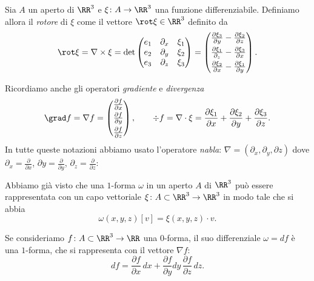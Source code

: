 \begin{definition}[rotore]
Sia $A$ un aperto di $\RR^3$ e $\xi \colon A \to \RR^3$ una funzione differenziabile.
Definiamo allora il \emph{rotore} di $\xi$ come il vettore $\rot \xi \in \RR^3$ 
definito da 
\[
   \rot \xi = \nabla \times \xi
    = \det \begin{pmatrix}
    e_1 & \partial_x & \xi_1 \\
    e_2 & \partial_y & \xi_2 \\
    e_3 & \partial_z & \xi_3 
    \end{pmatrix}
    = \begin{pmatrix}
    \frac{\partial \xi_3}{\partial y} - \frac{\partial \xi_2}{\partial z} \smallskip \\
    \frac{\partial \xi_1}{\partial_z} - \frac{\partial \xi_3}{\partial x} \smallskip \\
    \frac{\partial \xi_2}{\partial x} - \frac{\partial \xi_1}{\partial y}
    \end{pmatrix}.
\]

Ricordiamo anche gli operatori \emph{gradiente} e \emph{divergenza}
\[
  \grad f = \nabla f = \begin{pmatrix}
     \frac{\partial f}{\partial x} \smallskip \\
     \frac{\partial f}{\partial y} \smallskip \\
     \frac{\partial f}{\partial z}
  \end{pmatrix}, \qquad 
  \div f = \nabla \cdot \xi = \frac{\partial \xi_1}{\partial x} + \frac{\partial \xi_2}{\partial y} + \frac{\partial \xi_3}{\partial z}.
\]
In tutte queste notazioni abbiamo usato l'operatore \emph{nabla}: $\nabla = (\partial_x, \partial_y, \partial z)$
dove $\partial_x = \frac{\partial}{\partial x}$, $\partial y = \frac{\partial}{\partial y}$, $\partial_z = \frac{\partial}{\partial z}$:
\end{definition}

Abbiamo già visto che una $1$-forma $\omega$ in un aperto $A$ di $\RR^3$ può essere rappresentata 
con un capo vettoriale $\xi\colon A \subset \RR^3 \to \RR^3$ 
in modo tale che si abbia 
\[
  \omega(x,y,z)[v] = \xi(x,y,z)\cdot v.
\]

Se consideriamo $f\colon A\subset \RR^3\to \RR$ una $0$-forma, 
il suo differenziale $\omega = df$ è una $1$-forma, che si rappresenta 
con il vettore $\nabla f$:
\[
df = \frac{\partial f}{\partial x}\, dx 
+ \frac{\partial f}{\partial y} dy\, \frac{\partial f}{\partial z}\, dz.
\]

